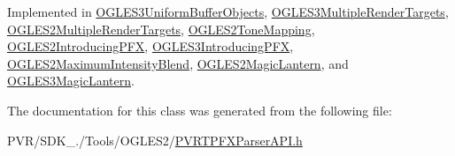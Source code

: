 Implemented in \hyperlink{class_o_g_l_e_s3_uniform_buffer_objects_a1e67140c3d440ca1ebe87e9a47697f05}{O\+G\+L\+E\+S3\+Uniform\+Buffer\+Objects}, \hyperlink{class_o_g_l_e_s3_multiple_render_targets_ac0b0f129337c632dd3eaa2c92f4d8e81}{O\+G\+L\+E\+S3\+Multiple\+Render\+Targets}, \hyperlink{class_o_g_l_e_s2_multiple_render_targets_a31e0cbbd733ee66cff38b85bb6455f84}{O\+G\+L\+E\+S2\+Multiple\+Render\+Targets}, \hyperlink{class_o_g_l_e_s2_tone_mapping_a1f8be1b9627360263ed24ac8d82534a3}{O\+G\+L\+E\+S2\+Tone\+Mapping}, \hyperlink{class_o_g_l_e_s2_introducing_p_f_x_a13c6eb452be5d14189fbd050ee6ae51d}{O\+G\+L\+E\+S2\+Introducing\+P\+F\+X}, \hyperlink{class_o_g_l_e_s3_introducing_p_f_x_aa25586d3be98ab288273c94cce4985f9}{O\+G\+L\+E\+S3\+Introducing\+P\+F\+X}, \hyperlink{class_o_g_l_e_s2_maximum_intensity_blend_a3477b27466041945ac77e639ca40182c}{O\+G\+L\+E\+S2\+Maximum\+Intensity\+Blend}, \hyperlink{class_o_g_l_e_s2_magic_lantern_a1acf935737794f6c7d6408aaa298d31b}{O\+G\+L\+E\+S2\+Magic\+Lantern}, and \hyperlink{class_o_g_l_e_s3_magic_lantern_a04772e79a905e4d11c59f3d69171097c}{O\+G\+L\+E\+S3\+Magic\+Lantern}.



The documentation for this class was generated from the following file\+:\begin{DoxyCompactItemize}
\item 
P\+V\+R/\+S\+D\+K\+\_./\+Tools/\+O\+G\+L\+E\+S2/\hyperlink{_p_v_r_t_p_f_x_parser_a_p_i_8h}{P\+V\+R\+T\+P\+F\+X\+Parser\+A\+P\+I.\+h}\end{DoxyCompactItemize}
